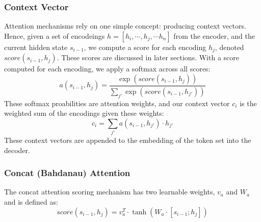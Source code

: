\subsubsection{Context Vector}
Attention mechanisms rely on one simple concept: producing context vectors.
Hence, given a set of encodeings $h = \left[h_i, \cdots, h_j, \cdots h_n \right]$
from the encoder, and the current hidden state $s_{i-1}$, we compute a score
for each encoding $h_j$, denoted $score(s_{i-1}, h_j)$. These scores are discussed
in later sections. With a score computed for each encoding, we apply a softmax
across all scores:
\begin{equation}
  a(s_{i-1}, h_j) = \frac{\exp(score(s_{i-1}, h_j))}{\sum_{j'} \exp(score(s_{i-1}, h_{j'}))}
\end{equation}
These softmax proabilities are attention weights, and our context vector $c_i$
is the weighted sum of the encodings given these weights:
\begin{equation}
  c_i = \sum_{j'} a(s_{i-1}, h_{j'}) \cdot h_{j'}
\end{equation}
These context vectors are appended to the embedding of the token set into the decoder.
\subsubsection{Concat (Bahdanau) Attention}
The concat attention scoring mechanism has two learnable weights, $v_a$ and $W_a$
and is defined as:
\begin{equation}
  score(s_{i-1}, h_j) = v_a^T \cdot \tanh \left( W_a \cdot \left[ s_{i-1} ; h_j \right] \right)
\end{equation}
